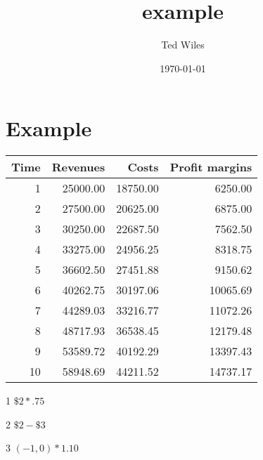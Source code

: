 \documentclass[11pt]{article}
\author{Ted Wiles}
\date{\today}
\title{example}
\begin{document}
\maketitle
\tableofcontents

\section{Example}
\label{sec-1}


\begin{table}
\centering
\begin{threeparttable}

\begin{tabular}{rrrr}
Time & Revenues & Costs\tnote{1} & Profit margins\tnote{2}\\
\hline
1 & 25000.00 & 18750.00 & 6250.00\\
2 & 27500.00 & 20625.00 & 6875.00\\
3 & 30250.00 & 22687.50 & 7562.50\\
4 & 33275.00 & 24956.25 & 8318.75\\
5 & 36602.50 & 27451.88 & 9150.62\\
6 & 40262.75 & 30197.06 & 10065.69\\
7 & 44289.03 & 33216.77 & 11072.26\\
8 & 48717.93 & 36538.45 & 12179.48\\
9 & 53589.72 & 40192.29 & 13397.43\\
10 & 58948.69 & 44211.52 & 14737.17\\
\hline
\end{tabular}

\begin{tablenotes}
\item [1] \(\$2*.75\)
\item [2] \(\$2-\$3\)
\item [3] \((-1,0)*1.10\)
\end{tablenotes}

\end{threeparttable}
\end{table}
\end{document}
